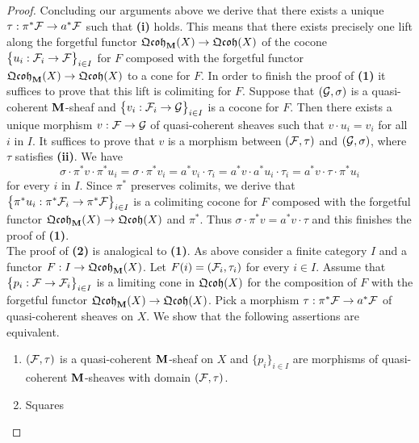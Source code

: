 \begin{proof}
Concluding our arguments above we derive that there exists a unique $\tau:\pi^*{\mathcal F}\rightarrow a^*{\mathcal F}$ such that \textbf{(i)} holds. This means that there exists precisely one lift  along the forgetful functor $\mathfrak{Qcoh}_{\mathbf{M}}(X)\rightarrow \mathfrak{Qcoh}(X)$ of the cocone $\big\{u_i:{\mathcal F}_i\rightarrow {\mathcal F}\big\}_{i\in I}$ for $F$ composed with the forgetful functor $\mathfrak{Qcoh}_{\mathbf{M}}(X)\rightarrow \mathfrak{Qcoh}(X)$ to a cone for $F$. In order to finish the proof of \textbf{(1)} it suffices to prove that this lift is colimiting for $F$. Suppose that $({\mathcal G},\sigma)$ is a quasi-coherent $\mathbf{M}$-sheaf and $\big\{v_i:{\mathcal F}_i\rightarrow {\mathcal G}\big\}_{i\in I}$ is a cocone for $F$. Then there exists a unique morphism $v:{\mathcal F}\rightarrow {\mathcal G}$ of quasi-coherent sheaves such that $v\cdot u_i = v_i$ for all $i$ in $I$. It suffices to prove that $v$ is a morphism between $({\mathcal F},\tau)$ and $({\mathcal G},\sigma)$, where $\tau$ satisfies \textbf{(ii)}. We have
$$\sigma \cdot \pi^*v \cdot \pi^* u_i = \sigma \cdot \pi^*v_i = a^*v_i \cdot \tau_i = a^*v \cdot a^*u_i\cdot \tau_i = a^*v \cdot \tau\cdot \pi^*u_i$$
for every $i$ in $I$. Since $\pi^*$ preserves colimits, we derive that $\big\{\pi^*u_i:\pi^*{\mathcal F}_i\rightarrow \pi^*{\mathcal F}\big\}_{i\in I}$ is a colimiting cocone for $F$ composed with the forgetful functor $\mathfrak{Qcoh}_{\mathbf{M}}(X)\rightarrow \mathfrak{Qcoh}(X)$ and $\pi^*$. Thus $\sigma \cdot \pi^*v = a^*v \cdot \tau$ and this finishes the proof of \textbf{(1)}.\\
The proof of \textbf{(2)} is analogical to \textbf{(1)}. As above consider a finite category $I$ and a functor $F:I\rightarrow \mathfrak{Qcoh}_{\mathbf{M}}(X)$. Let $F(i) = ({\mathcal F}_i,\tau_i)$ for every $i\in I$. Assume that $\big\{p_i:{\mathcal F} \rightarrow {\mathcal F}_i\big\}_{i\in I}$ is a limiting cone in $\mathfrak{Qcoh}(X)$ for the composition of $F$ with the forgetful functor $\mathfrak{Qcoh}_{\mathbf{M}}(X)\rightarrow \mathfrak{Qcoh}(X)$. Pick a morphism $\tau:\pi^*{\mathcal F}\rightarrow a^*{\mathcal F}$ of quasi-coherent sheaves on $X$. We show that the following assertions are equivalent.
\begin{enumerate}[label= \textbf{(\roman*)}, leftmargin=3.0em]
\item $({\mathcal F},\tau)$ is a quasi-coherent $\mathbf{M}$-sheaf on $X$ and $\{p_i\}_{i\in I}$ are morphisms of quasi-coherent $\mathbf{M}$-sheaves with domain $({\mathcal F},\tau)$.
\item Squares
\begin{center}
\end{center}
\end{enumerate}
\end{proof}
